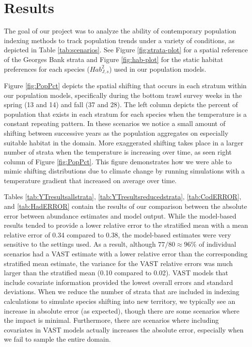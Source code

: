 \documentclass[
  12pt,
]{article}
\begin{document}
\section{Results}

The goal of our project was to analyze the ability of contemporary population indexing methods to track population trends under a variety of conditions, as depicted in Table \ref{tab:scenarios}. See Figure \ref{fig:strata-plot} for a spatial reference of the Georges Bank strata and Figure \ref{fig:hab-plot} for the static habitat preferences for each species (\(Hab^2_{J,s}\)) used in our population models.

Figure \ref{fig:PopPct} depicts the spatial shifting that occurs in each stratum within our population models, specifically during the bottom trawl survey weeks in the spring (13 and 14) and fall (37 and 28). The left column depicts the percent of population that exists in each stratum for each species when the temperature is a constant repeating pattern. In these scenarios we notice a small amount of shifting between successive years as the population aggregates on especially suitable habitat in the domain. More exaggerated shifting takes place in a larger number of strata when the temperature is increasing over time, as seen right column of Figure \ref{fig:PopPct}. This figure demonstrates how we were able to mimic shifting distributions due to climate change by running simulations with a temperature gradient that increased on average over time.

Tables \ref{tab:YTresultsallstrata}, \ref{tab:YTresultsreducedstrata}, \ref{tab:CodERROR}, and \ref{tab:HadERROR} contain the results of our comparison between the absolute error between abundance estimates and model output. While the model-based results tended to provide a lower relative error to the stratified mean with a mean relative error of 0.34 compared to 0.38, the model-based estimates were very sensitive to the settings used. As a result, although \(77/80\approx 96\%\) of individual scenarios had a VAST estimate with a lower relative error than the corresponding stratified mean estimate, the variance for the VAST relative errors was much larger than the stratified mean (0.10 compared to 0.02). VAST models that include covariate information provided the lowest overall errors and standard deviations. When we reduce the number of strata that are included in indexing calculations to simulate species shifting into new territory, we typically see an increase in absolute error (as expected), though there are some scenarios where the impact is minimal. Furthermore, there are scenarios where including covariates in VAST models actually increases the absolute error, especially when we fail to sample the entire domain.
\end{document}
